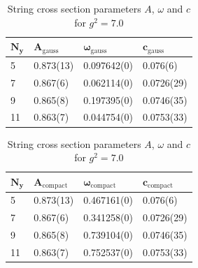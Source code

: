 \begin{table}[!hb]
\centering
\begin{tabular}{llll}
    $\mathbf{N_y}$ & $\mathbf{A_\mathrm{gauss}}$ & $\mathbf{\omega_\mathrm{gauss}}$ & $\mathbf{c_\mathrm{gauss}}$ \\ \hline
   5 & 0.873(13) & 0.097642(0) & 0.076(6) \\
   7 & 0.867(6) & 0.062114(0) & 0.0726(29) \\
   9 & 0.865(8) & 0.197395(0) & 0.0746(35) \\
   11 & 0.863(7) & 0.044754(0) & 0.0753(33) \\
\end{tabular}
\begin{tabular}{llll}
    $\mathbf{N_y}$ & $\mathbf{A_\mathrm{compact}}$ & $\mathbf{\omega_\mathrm{compact}}$ & $\mathbf{c_\mathrm{compact}}$ \\ \hline
   5 & 0.873(13) & 0.467161(0) & 0.076(6) \\
   7 & 0.867(6) & 0.341258(0) & 0.0726(29) \\
   9 & 0.865(8) & 0.739104(0) & 0.0746(35) \\
   11 & 0.863(7) & 0.752537(0) & 0.0753(33) \\
\end{tabular}
\caption{String cross section parameters $A$, $\omega$ and $c$ for $g^2=7.0$}
\end{table}

